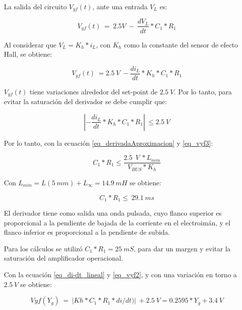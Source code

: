 \noindent La salida del circuito $V_{yf}(t)$, ante una entrada $V_L$ es:

\begin{equation} \label{eq_vyf1}
	V_{yf}(t)\ =\ 2.5V\ -\ \frac{dV_L}{dt}*C_1*R_1
\end{equation}


\noindent Al considerar que $V_L=K_h*i_L$, con $K_h$ como la constante del sensor de efecto Hall, se obtiene: 

\begin{equation} \label{eq_vyf2}
	V_{yf}(t)\ =2.5\:V\ -\frac{di_L}{dt}*K_h*C_1*R_1
\end{equation}

\noindent $V_{yf}(t)$ tiene variaciones alrededor del set-point de $2.5\:V$. Por lo tanto, para evitar la saturaci\'{o}n del derivador se debe cumplir que:

\begin{equation} \label{eq_vyf3}
	\left|-\frac{di_L}{dt}*K_h*C_1*R_1\right|\ \le 2.5\:V
\end{equation}

\noindent Por lo tanto, con la ecuaci\'{o}n \ref{eq_derivadaAproximacion} y \ref{eq_vyf3}:

\begin{equation} \label{eq_condicionC1-R1}
	C_1*R_1\le\frac{2.5\ \:V\ *L_{min}}{V_{BUS}*K_h}
\end{equation}

\noindent Con $L_{min}= L(5\: mm) + L_{\infty}= 14.9\: mH$ se obtiene: 

\begin{equation} \label{eq_condicionC1-R1-2}
	C_1*R_1\le\ 29.1\ ms
\end{equation}

\noindent El derivador tiene como salida una onda pulsada, cuyo flanco superior  es proporcional a la pendiente de bajada de la corriente en el electroim\'{a}n, y el flanco inferior es proporcional a la pendiente de subida. 

\noindent Para los c\'{a}lculos se utiliz\'{o} $C_1*R_1= 25\: mS$, para dar un margen y evitar la saturaci\'{o}n del amplificador operacional.  

\noindent Con la ecuaci\'{o}n \ref{eq_di-dt_lineal} y \ref{eq_vyf2}, y con una variaci\'{o}n en torno a $2.5\:V$ se obtiene:


\begin{equation} \label{eq_Vyf-lineal}
	Vyf(Y_g)\ =\ |Kh*C_1*R_1*di/dt)|\ +2.5\:V=0.2595*Y_g+3.4\:V
\end{equation}

